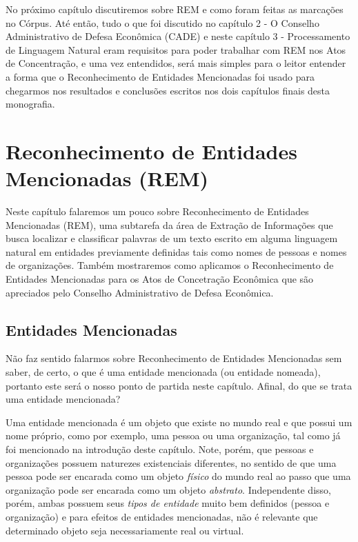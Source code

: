 \documentclass[11pt]{report}
\begin{document}
No próximo capítulo discutiremos sobre REM e como foram feitas as marcações no Córpus. Até então, tudo o que foi discutido no capítulo 2 - O Conselho Administrativo de Defesa Econômica (CADE) e neste capítulo 3 - Processamento de Linguagem Natural eram
requisitos para poder trabalhar com REM nos Atos de Concentração, e uma vez entendidos, será mais simples para o leitor entender a forma que o Reconhecimento de Entidades
Mencionadas foi usado para chegarmos nos resultados e conclusões escritos nos dois capítulos finais desta monografia.

\pagebreak
\chapter{Reconhecimento de Entidades Mencionadas (REM)}

\indent\indent Neste capítulo falaremos um pouco sobre Reconhecimento de Entidades Mencionadas (REM), uma subtarefa da área de Extração de Informações que busca localizar e classificar
palavras de um texto escrito em alguma linguagem natural em entidades previamente definidas tais como nomes de pessoas e nomes de organizações. Também mostraremos como
aplicamos o Reconhecimento de Entidades Mencionadas para os Atos de Concetração Econômica que são apreciados pelo Conselho Administrativo de Defesa Econômica.

\section{Entidades Mencionadas}

\indent\indent Não faz sentido falarmos sobre Reconhecimento de Entidades Mencionadas sem saber, de certo, o que é uma entidade mencionada (ou entidade nomeada), portanto este
será o nosso ponto de partida neste capítulo. Afinal, do que se trata uma entidade mencionada?

Uma entidade mencionada é um objeto que existe no mundo real e que possui um nome próprio, como por exemplo, uma pessoa ou uma organização, tal como já foi mencionado na introdução
deste capítulo. Note, porém, que pessoas e organizações possuem naturezes existenciais diferentes, no sentido de que uma pessoa pode ser encarada como um objeto \textit{físico} do mundo real
ao passo que uma organização pode ser encarada como um objeto \textit{abstrato}. Independente disso, porém, ambas possuem seus \textit{tipos de entidade} muito bem definidos
(pessoa e organização) e para efeitos de entidades mencionadas, não é relevante que determinado objeto seja necessariamente real ou virtual.
\end{document}
